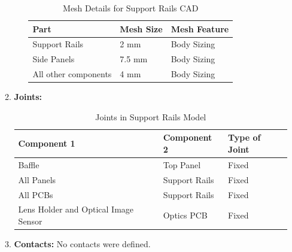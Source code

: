 \documentclass[../../main.tex]{subfiles}
\begin{document}
\begin{enumerate}
\begin{enumerate}
\begin{enumerate}
                    \begin{table}[h!]
                    \centering
                    \begin{tabular}{|p{5cm}|p{3cm}|p{3cm}|}
                        \hline
                        Part & Mesh Size & Mesh Feature  \\
                        \hline
                        Support Rails & 2 mm & Body Sizing \\
                        \hline
                        Side Panels & 7.5 mm & Body Sizing \\
                        \hline 
                        All other components & 4 mm & Body Sizing \\
                        \hline
                    \end{tabular}
                    \caption{Mesh Details for Support Rails CAD}
                    \label{tab:my_label}
                \end{table}
            \end{enumerate}
            \item \textbf{Joints: }
            \begin{table}[h!]
                \centering
                \begin{tabular}{|p{8cm}|p{3cm}|p{3cm}|}
                    \hline
                    \textbf{Component 1} & \textbf{Component 2} & \textbf{Type of Joint} \\
                    \hline
                    Baffle & Top Panel & Fixed  \\
                    \hline
                    All Panels & Support Rails & Fixed \\
                    \hline
                    All PCBs & Support Rails & Fixed \\
                    \hline
                    Lens Holder and Optical Image Sensor & Optics PCB  & Fixed \\
                    \hline
                \end{tabular}
                \caption{Joints in Support Rails Model}
                \label{tab:my_label}
            \end{table}
            \item \textbf{Contacts:}  No contacts were defined.
            \newline
            \newline
            \newline
            \newline

\end{enumerate}
\end{enumerate}
\end{document}
